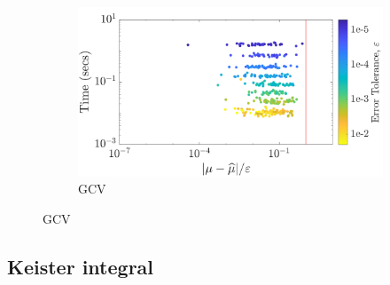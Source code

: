 \documentclass[handout, 10pt,compress,xcolor={usenames,dvipsnames}]{beamer} %
\begin{document}
{\begin{figure}[htp]
\begin{subfigure}[b]{0.48\textwidth}
			\includegraphics[width=\textwidth]{"../figures/Sobol/Sobol_MVN_guaranteed_time_GCV__d2_r1_2019-Sep-1"}
			\caption{GCV}
		\end{subfigure}
	\end{figure}
}





\subsection{Keister integral}
\end{document}
